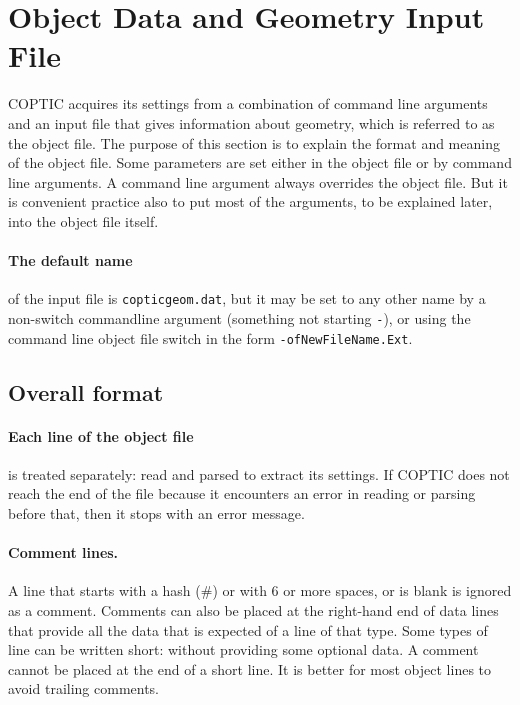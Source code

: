 \documentclass[12pt]{article}
\begin{document}
\section{Object Data and Geometry Input File}\label{infile}

COPTIC acquires its settings from a combination of command line
arguments and an input file that gives information about geometry,
which is referred to as the object file.  The purpose of this section
is to explain the format and meaning of the object file. Some
parameters are set either in the object file or by command line
arguments. A command line argument always overrides the object file.
But it is convenient practice also to put most of the arguments, to be
explained later, into the object file itself.

\paragraph{The default name} of the input file is \verb!copticgeom.dat!, but it
may be set to any other name by a non-switch commandline argument
(something not starting \verb!-!), or using the command line object file
switch in the form \verb!-ofNewFileName.Ext!.

\subsection{Overall format}

\paragraph{Each line of the object file} is treated separately: read and parsed to
extract its settings. If COPTIC does not reach the end of the file
because it encounters an error in reading or parsing before that, then
it stops with an error message.

\paragraph{Comment lines.} A line that starts with a hash (\#) 
or with 6 or more spaces, or is blank is ignored as a
comment. Comments can also be placed at the right-hand end of data
lines that provide all the data that is expected of a line of that
type. Some types of line can be written short: without providing some
optional data. A comment cannot be placed at the end of a short line.
It is better for most object lines to avoid trailing comments.
\end{document}

